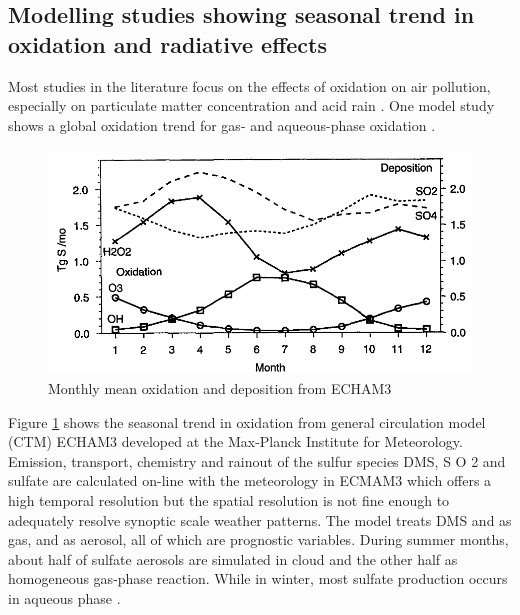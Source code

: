 \subsection{Modelling studies showing seasonal trend in  oxidation and radiative effects}

Most studies in the literature focus on the effects of  oxidation on air pollution, especially on particulate matter concentration and acid rain \cite[e.g.][]{eatoughConversionSO2Sulfate1994} . One model study shows a global  oxidation trend for gas- and aqueous-phase oxidation \cite{feichterSimulationTroposphericSulfur1996}. 

\begin{figure}
    \centering
    \includegraphics[width=0.8\linewidth]{Chapter4/Figs/feitcher1996.png}
    \caption{Monthly mean  oxidation and deposition from ECHAM3 \cite{feichterSimulationTroposphericSulfur1996}}
    \label{fig:ch4:feichter1996}
\end{figure}

Figure \ref{fig:ch4:feichter1996} shows the seasonal trend in  oxidation from general circulation model (CTM) ECHAM3 developed at the Max-Planck Institute for Meteorology. Emission, transport, chemistry and rainout of the sulfur species DMS, S O 2 and sulfate are
calculated on-line with the meteorology in ECMAM3 which offers a high temporal resolution but the spatial resolution is not fine enough to adequately resolve synoptic scale weather patterns. The  model treats DMS and  as gas, and  as aerosol, all of which are prognostic variables. During summer months, about half of sulfate aerosols are simulated in cloud and the other half as homogeneous gas-phase reaction. While in winter, most sulfate production occurs in aqueous phase \citep{feichterSimulationTroposphericSulfur1996}.


